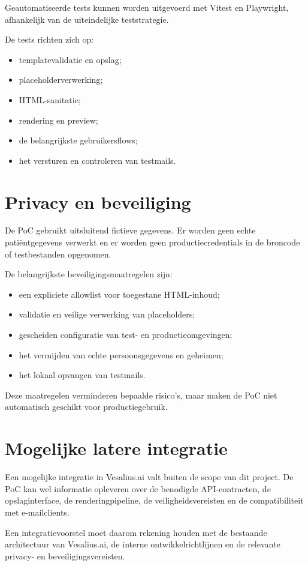 Geautomatiseerde tests kunnen worden uitgevoerd met Vitest en Playwright,
afhankelijk van de uiteindelijke teststrategie.

De tests richten zich op:
\begin{itemize}
    \item templatevalidatie en opslag;
    \item placeholderverwerking;
    \item HTML-sanitatie;
    \item rendering en preview;
    \item de belangrijkste gebruikersflows;
    \item het versturen en controleren van testmails.
\end{itemize}

\section{Privacy en beveiliging}
De PoC gebruikt uitsluitend fictieve gegevens. Er worden geen echte
patiëntgegevens verwerkt en er worden geen productiecredentials in de
broncode of testbestanden opgenomen.

De belangrijkste beveiligingsmaatregelen zijn:
\begin{itemize}
    \item een expliciete allowlist voor toegestane HTML-inhoud;
    \item validatie en veilige verwerking van placeholders;
    \item gescheiden configuratie van test- en productieomgevingen;
    \item het vermijden van echte persoonsgegevens en geheimen;
    \item het lokaal opvangen van testmails.
\end{itemize}

Deze maatregelen verminderen bepaalde risico's, maar maken de PoC niet
automatisch geschikt voor productiegebruik.

\section{Mogelijke latere integratie}
Een mogelijke integratie in Vesalius.ai valt buiten de scope van dit project.
De PoC kan wel informatie opleveren over de benodigde API-contracten, de
opslaginterface, de renderingpipeline, de veiligheidsvereisten en de
compatibiliteit met e-mailclients.

Een integratievoorstel moet daarom rekening houden met de bestaande
architectuur van Vesalius.ai, de interne ontwikkelrichtlijnen en de
relevante privacy- en beveiligingsvereisten.